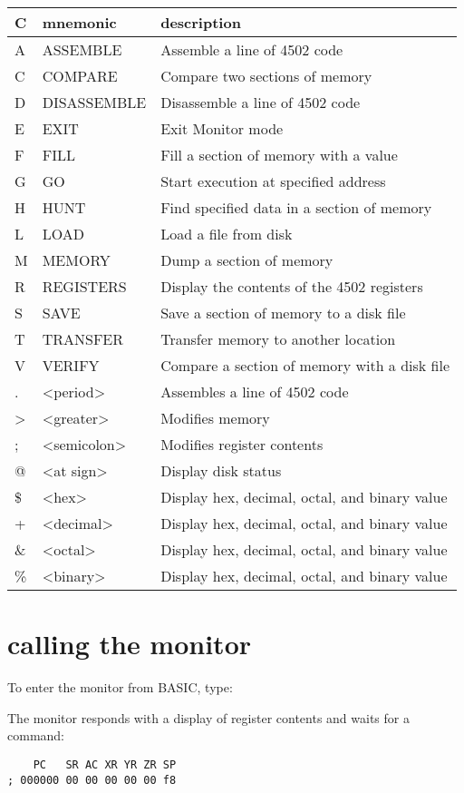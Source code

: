 \ttfamily
{\setlength{\tabcolsep}{1mm}
\begin{tabular}{|l|l|l|}
\hline
C & mnemonic & description \\
\hline
A &     ASSEMBLE        & Assemble a line of 4502 code\\
C &     COMPARE         & Compare two sections of memory\\
D &     DISASSEMBLE     & Disassemble a line of 4502 code\\
E &     EXIT            & Exit Monitor mode\\
F &     FILL            & Fill a section of memory with a value \\
G &     GO              & Start execution at specified address\\
H &     HUNT            & Find specified data in a section of memory\\
L &     LOAD            & Load a file from disk\\
M &     MEMORY          & Dump a section of memory\\
R &     REGISTERS       & Display the contents of the 4502 registers\\
S &     SAVE            & Save a section of memory to a disk file\\
T &     TRANSFER        & Transfer memory to another location\\
V &     VERIFY          & Compare a section of memory with a disk file\\
\hline
 . &     <period>        & Assembles a line of 4502 code\\
 > &     <greater>       & Modifies memory\\
 ; &     <semicolon>     & Modifies register contents\\
 @ &     <at sign>       & Display disk status\\
\hline
\$ &     <hex>           & Display hex, decimal, octal, and binary value \\
 + &     <decimal>       & Display hex, decimal, octal, and binary value\\
\& &     <octal>         & Display hex, decimal, octal, and binary value\\
\% &     <binary>        & Display hex, decimal, octal, and binary value\\
\hline
\end{tabular}
}

\section {calling the monitor}

To enter the monitor from BASIC, type:

The monitor responds with a display of register contents and waits for a command:

\begin{tcolorbox}[colback=black,coltext=white]
\verbatimfont{\codefont}
\begin{verbatim}
    PC   SR AC XR YR ZR SP
; 000000 00 00 00 00 00 f8
\end{verbatim}
\end{tcolorbox}


